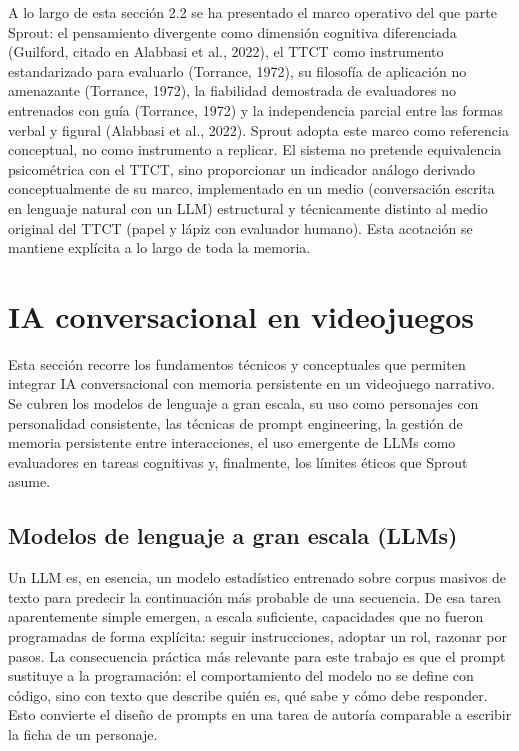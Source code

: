\documentclass[12pt,twoside,titlepage]{report}
\begin{document}
A lo largo de esta sección 2.2 se ha presentado el marco operativo del que parte Sprout: el pensamiento divergente como dimensión cognitiva diferenciada (Guilford, citado en Alabbasi et al., 2022), el TTCT como instrumento estandarizado para evaluarlo (Torrance, 1972), su filosofía de aplicación no amenazante (Torrance, 1972), la fiabilidad demostrada de evaluadores no entrenados con guía (Torrance, 1972) y la independencia parcial entre las formas verbal y figural (Alabbasi et al., 2022). Sprout adopta este marco como referencia conceptual, no como instrumento a replicar. El sistema no pretende equivalencia psicométrica con el TTCT, sino proporcionar un indicador análogo derivado conceptualmente de su marco, implementado en un medio (conversación escrita en lenguaje natural con un LLM) estructural y técnicamente distinto al medio original del TTCT (papel y lápiz con evaluador humano). Esta acotación se mantiene explícita a lo largo de toda la memoria.

\section{IA conversacional en videojuegos}

Esta sección recorre los fundamentos técnicos y conceptuales que permiten integrar IA conversacional con memoria persistente en un videojuego narrativo. Se cubren los modelos de lenguaje a gran escala, su uso como personajes con personalidad consistente, las técnicas de prompt engineering, la gestión de memoria persistente entre interacciones, el uso emergente de LLMs como evaluadores en tareas cognitivas y, finalmente, los límites éticos que Sprout asume.

\subsection{Modelos de lenguaje a gran escala (LLMs)}

Un LLM es, en esencia, un modelo estadístico entrenado sobre corpus masivos de texto para predecir la continuación más probable de una secuencia. De esa tarea aparentemente simple emergen, a escala suficiente, capacidades que no fueron programadas de forma explícita: seguir instrucciones, adoptar un rol, razonar por pasos. La consecuencia práctica más relevante para este trabajo es que el prompt sustituye a la programación: el comportamiento del modelo no se define con código, sino con texto que describe quién es, qué sabe y cómo debe responder. Esto convierte el diseño de prompts en una tarea de autoría comparable a escribir la ficha de un personaje.
\end{document}
